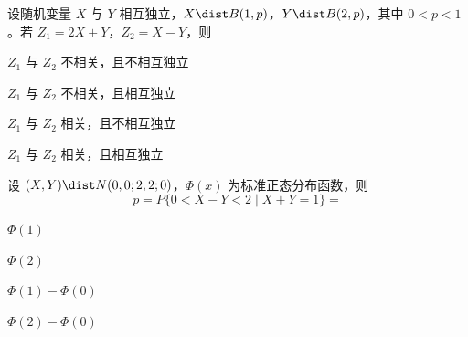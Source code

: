 \begin{question}[index=9]
设随机变量 $X$ 与 $Y$ 相互独立，$X\dist B(1,p)$，$Y\dist B(2,p)$，其中 $0<p<1$。若 $Z_1=2X+Y$，$Z_2=X-Y$，则
\begin{choices}[columns=2]
\item $Z_1$ 与 $Z_2$ 不相关，且不相互独立
\item $Z_1$ 与 $Z_2$ 不相关，且相互独立
\item $Z_1$ 与 $Z_2$ 相关，且不相互独立
\item $Z_1$ 与 $Z_2$ 相关，且相互独立
\end{choices}
\end{question}
\QuestionBreak

\begin{question}[index=10]
设 $(X,Y)\dist N(0,0;2,2;0)$，$\Phi(x)$ 为标准正态分布函数，则
\[
p=P\{0<X-Y<2\mid X+Y=1\}=
\]
\begin{choices}[columns=4]
\item $\Phi(1)$
\item $\Phi(2)$
\item $\Phi(1)-\Phi(0)$
\item $\Phi(2)-\Phi(0)$
\end{choices}
\end{question}
